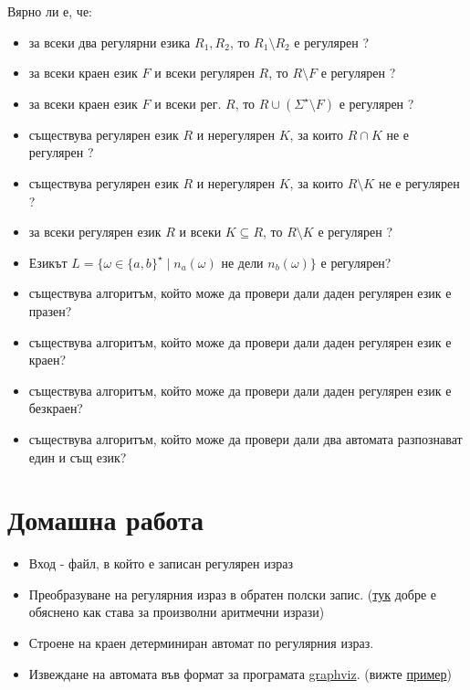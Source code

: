 Вярно ли е, че:
\begin{itemize}
\item
  за всеки два регулярни езика $R_1, R_2$, то $R_1 \setminus R_2$ е регулярен ?
\item
  за всеки краен език $F$ и всеки регулярен $R$, то $R\setminus F$ е регулярен ?
\item
  за всеки краен език $F$ и всеки рег. $R$, то $R\cup (\Sigma^\star \setminus F)$ е регулярен ?
\item
  съществува регулярен език $R$ и нерегулярен $K$, за които $R\cap K$ не е регулярен ?
\item
  съществува регулярен език $R$ и нерегулярен $K$, за които $R\setminus K$ не е регулярен ?
\item
  за всеки регулярен език $R$ и всеки $K \subseteq R$, то $R\setminus K$ е регулярен ?
\item
  Езикът $L = \{\omega \in \{a,b\}^\star \mid n_a(\omega) \text{ не дели }n_b(\omega)\}$ е регулярен?
\item
  съществува алгоритъм, който може да провери дали даден регулярен език е празен?
\item
  съществува алгоритъм, който може да провери дали даден регулярен език е краен?
\item
  съществува алгоритъм, който може да провери дали даден регулярен език е безкраен?
\item
  съществува алгоритъм, който може да провери дали два автомата разпознават един и същ език?
\end{itemize}


\section{Домашна работа}

\begin{itemize}
\item
  Вход - файл, в който е записан регулярен израз
\item
  Преобразуване на регулярния израз в обратен полски запис.
  (\href{http://en.wikipedia.org/wiki/Shunting-yard_algorithm}{тук} 
  добре е обяснено как става за произволни аритмечни изрази)
\item
  Строене на краен детерминиран автомат по регулярния израз.
\item
  Извеждане на автомата във формат за програмата \href{http://graphviz.org}{graphviz}.
  (вижте \href{http://sundarpillay.blogspot.com/2012/02/graphviz-and-finite-automata-diagrams_05.html}{пример})
\end{itemize}


